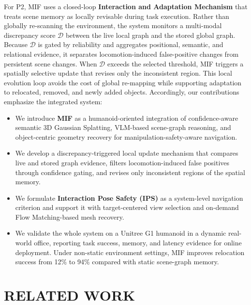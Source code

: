 \documentclass[conference]{IEEEtran}
\begin{document}
%
For P2, MIF uses a closed-loop \textbf{Interaction and Adaptation Mechanism} that treats scene memory as locally revisable during task execution.
%
Rather than globally re-scanning the environment, the system monitors a multi-modal discrepancy score $\mathcal{D}$ between the live local graph and the stored global graph.
%
Because $\mathcal{D}$ is gated by reliability and aggregates positional, semantic, and relational evidence, it separates locomotion-induced false-positive changes from persistent scene changes.
%
When $\mathcal{D}$ exceeds the selected threshold, MIF triggers a spatially selective update that revises only the inconsistent region.
%
This local evolution loop avoids the cost of global re-mapping while supporting adaptation to relocated, removed, and newly added objects.
%
Accordingly, our contributions emphasize the integrated system:

\begin{itemize}
    \item We introduce \textbf{MIF} as a humanoid-oriented integration of confidence-aware semantic 3D Gaussian Splatting, VLM-based scene-graph reasoning, and object-centric geometry recovery for manipulation-safety-aware navigation.
    
    \item We develop a discrepancy-triggered local update mechanism that compares live and stored graph evidence, filters locomotion-induced false positives through confidence gating, and revises only inconsistent regions of the spatial memory.
    
    \item We formulate \textbf{Interaction Pose Safety (IPS)} as a system-level navigation criterion and support it with target-centered view selection and on-demand Flow Matching-based mesh recovery.
    
    \item We validate the whole system on a Unitree G1 humanoid in a dynamic real-world office, reporting task success, memory, and latency evidence for online deployment. 
    Under non-static environment settings, MIF improves relocation success from 12\% to 94\% compared with static scene-graph memory.
\end{itemize}


\section{RELATED WORK}
\label{sec:related_work}
\end{document}
